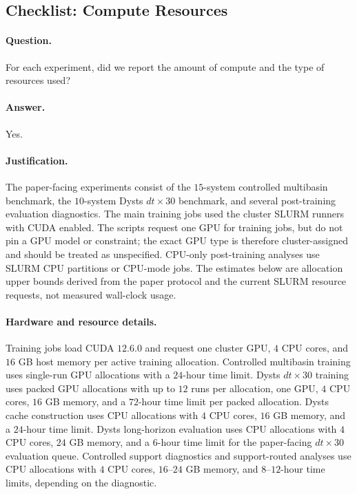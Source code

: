 \subsection{Checklist: Compute Resources}
\label{app:checklist_compute_resources}

\paragraph{Question.}
For each experiment, did we report the amount of compute and the type of
resources used?

\paragraph{Answer.}
Yes.

\paragraph{Justification.}
The paper-facing experiments consist of the \(15\)-system controlled
multibasin benchmark, the \(10\)-system Dysts \(dt{\times}30\) benchmark, and
several post-training evaluation diagnostics.  The main training jobs used the
cluster SLURM runners with CUDA enabled.  The scripts request one GPU for
training jobs, but do not pin a GPU model or constraint; the exact GPU type is
therefore cluster-assigned and should be treated as unspecified.  CPU-only
post-training analyses use SLURM CPU partitions or CPU-mode jobs.  The
estimates below are allocation upper bounds derived from the paper protocol
and the current SLURM resource requests, not measured wall-clock usage.

\paragraph{Hardware and resource details.}
Training jobs load CUDA \(12.6.0\) and request one cluster GPU, \(4\) CPU cores,
and \(16\) GB host memory per active training allocation.  Controlled
multibasin training uses single-run GPU allocations with a \(24\)-hour time
limit.  Dysts \(dt{\times}30\) training uses packed GPU allocations with up to
\(12\) runs per allocation, one GPU, \(4\) CPU cores, \(16\) GB memory, and a
\(72\)-hour time limit per packed allocation.  Dysts cache construction uses
CPU allocations with \(4\) CPU cores, \(16\) GB memory, and a \(24\)-hour time
limit.  Dysts long-horizon evaluation uses CPU allocations with \(4\) CPU
cores, \(24\) GB memory, and a \(6\)-hour time limit for the paper-facing
\(dt{\times}30\) evaluation queue.  Controlled support diagnostics and
support-routed analyses use CPU allocations with \(4\) CPU cores, \(16\)--\(24\)
GB memory, and \(8\)--\(12\)-hour time limits, depending on the diagnostic.

